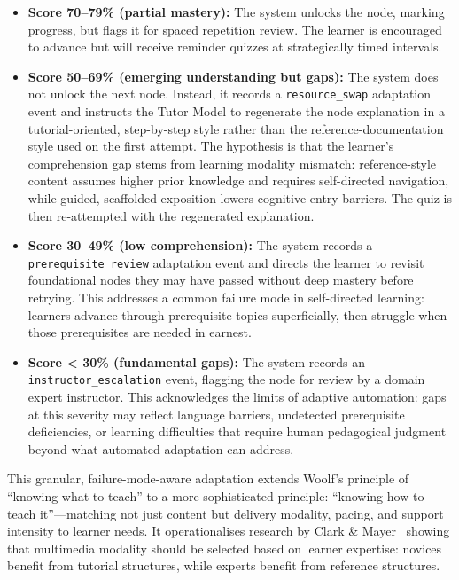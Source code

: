 \begin{itemize}
    \item \textbf{Score 70--79\% (partial mastery):} The system unlocks the node, marking progress, but flags it for spaced repetition review. The learner is encouraged to advance but will receive reminder quizzes at strategically timed intervals.
    \item \textbf{Score 50--69\% (emerging understanding but gaps):} The system does not unlock the next node. Instead, it records a \texttt{resource\_swap} adaptation event and instructs the Tutor Model to regenerate the node explanation in a tutorial-oriented, step-by-step style rather than the reference-documentation style used on the first attempt. The hypothesis is that the learner's comprehension gap stems from learning modality mismatch: reference-style content assumes higher prior knowledge and requires self-directed navigation, while guided, scaffolded exposition lowers cognitive entry barriers. The quiz is then re-attempted with the regenerated explanation.
    \item \textbf{Score 30--49\% (low comprehension):} The system records a \texttt{prerequisite\_review} adaptation event and directs the learner to revisit foundational nodes they may have passed without deep mastery before retrying. This addresses a common failure mode in self-directed learning: learners advance through prerequisite topics superficially, then struggle when those prerequisites are needed in earnest.
    \item \textbf{Score < 30\% (fundamental gaps):} The system records an \texttt{instructor\_escalation} event, flagging the node for review by a domain expert instructor. This acknowledges the limits of adaptive automation: gaps at this severity may reflect language barriers, undetected prerequisite deficiencies, or learning difficulties that require human pedagogical judgment beyond what automated adaptation can address.
\end{itemize}

This granular, failure-mode-aware adaptation extends Woolf's principle of \enquote{knowing what to teach} to a more sophisticated principle: \enquote{knowing how to teach it}---matching not just content but delivery modality, pacing, and support intensity to learner needs. It operationalises research by Clark \& Mayer~\cite{clark2016} showing that multimedia modality should be selected based on learner expertise: novices benefit from tutorial structures, while experts benefit from reference structures.

